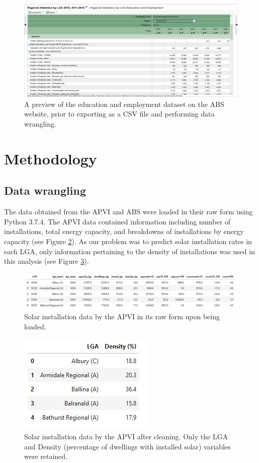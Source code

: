 \documentclass[a4paper]{article}
\begin{document}
\begin{figure}
\centering
  \includegraphics[width=\linewidth]{fig2.png}
  \caption{A preview of the education and employment dataset on the ABS website, prior to exporting as a CSV file and performing data wrangling.}
  \label{fig:fig2}
\end{figure}

\section{Methodology}

\subsection{Data wrangling}

The data obtained from the APVI and ABS were loaded in their raw form using Python 3.7.4. The APVI data contained information including number of installations, total energy capacity, and breakdowns of installations by energy capacity (see Figure \ref{fig:fig3}). As our problem was to predict solar installation rates in each LGA, only information pertaining to the density of installations was used in this analysis (see Figure \ref{fig:fig4}). \\

\begin{figure}
\centering
  \includegraphics[width=\linewidth]{fig3.png}
  \caption{Solar installation data by the APVI in its raw form upon being loaded.}
  \label{fig:fig3}
\end{figure}

\begin{figure}
\centering
  \includegraphics{fig4.png}
  \caption{Solar installation data by the APVI after cleaning. Only the LGA and Density (percentage of dwellings with installed solar) variables were retained.}
  \label{fig:fig4}
\end{figure}
\end{document}
